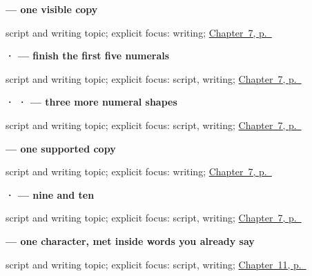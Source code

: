 \noindent\begin{minipage}[t]{\linewidth}
\raggedright
\textbf{     — one visible copy}\par
\footnotesize script and writing topic; explicit focus: writing; \hyperref[ch:ml-numbers-one-to-ten]{Chapter~7, p.~\pageref*{ch:ml-numbers-one-to-ten}}
\end{minipage}\par\smallskip

\noindent\begin{minipage}[t]{\linewidth}
\raggedright
\textbf{ ·  — finish the first five numerals}\par
\footnotesize script and writing topic; explicit focus: script, writing; \hyperref[ch:ml-numbers-one-to-ten]{Chapter~7, p.~\pageref*{ch:ml-numbers-one-to-ten}}
\end{minipage}\par\smallskip

\noindent\begin{minipage}[t]{\linewidth}
\raggedright
\textbf{ ·  ·  — three more numeral shapes}\par
\footnotesize script and writing topic; explicit focus: script, writing; \hyperref[ch:ml-numbers-one-to-ten]{Chapter~7, p.~\pageref*{ch:ml-numbers-one-to-ten}}
\end{minipage}\par\smallskip

\noindent\begin{minipage}[t]{\linewidth}
\raggedright
\textbf{     — one supported copy}\par
\footnotesize script and writing topic; explicit focus: writing; \hyperref[ch:ml-numbers-one-to-ten]{Chapter~7, p.~\pageref*{ch:ml-numbers-one-to-ten}}
\end{minipage}\par\smallskip

\noindent\begin{minipage}[t]{\linewidth}
\raggedright
\textbf{ ·  — nine and ten}\par
\footnotesize script and writing topic; explicit focus: script, writing; \hyperref[ch:ml-numbers-one-to-ten]{Chapter~7, p.~\pageref*{ch:ml-numbers-one-to-ten}}
\end{minipage}\par\smallskip

\noindent\begin{minipage}[t]{\linewidth}
\raggedright
\textbf{ — one character, met inside words you already say}\par
\footnotesize script and writing topic; explicit focus: script, writing; \hyperref[ch:ml-core-colours]{Chapter~11, p.~\pageref*{ch:ml-core-colours}}
\end{minipage}\par\smallskip

